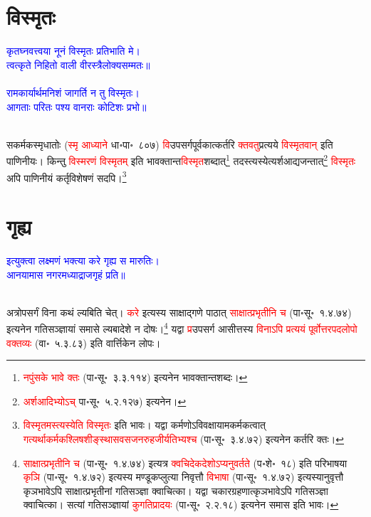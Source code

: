 \section[विस्मृतः]{विस्मृतः}
\centering\textcolor{blue}{कृतघ्नवत्त्वया नूनं विस्मृतः प्रतिभाति मे।\nopagebreak\\
त्वत्कृते निहितो वाली वीरस्त्रैलोक्यसम्मतः॥}\nopagebreak\\
\\
\centering\textcolor{blue}{रामकार्यार्थमनिशं जागर्ति न तु विस्मृतः।\nopagebreak\\
आगताः परितः पश्य वानराः कोटिशः प्रभो॥}\nopagebreak\\
\\
\begin{sloppypar}\justifying\noindent\hspace{10mm} सकर्मक\-स्मृ\-धातोः (\textcolor{red}{स्मृ आध्याने} धा॰पा॰~८०७) \textcolor{red}{वि}\-उपसर्ग\-पूर्वकात्कर्तरि \textcolor{red}{क्तवतु}\-प्रत्यये \textcolor{red}{विस्मृतवान्} इति पाणिनीयः। किन्तु \textcolor{red}{विस्मरणं विस्मृतम्} इति भाव\-क्तान्त\-\textcolor{red}{विस्मृत}\-शब्दात्\footnote{\textcolor{red}{नपुंसके भावे क्तः} (पा॰सू॰~३.३.११४) इत्यनेन भाव\-क्तान्त\-शब्दः।} तदस्त्यस्येत्यर्शआद्यजन्तात्\footnote{\textcolor{red}{अर्शआदिभ्योऽच्} पा॰सू॰~५.२.१२७) इत्यनेन।} \textcolor{red}{विस्मृतः} अपि पाणिनीयं कर्तृ\-विशेषणं सदपि।\footnote{\textcolor{red}{विस्मृतमस्त्यस्येति विस्मृतः} इति भावः। यद्वा कर्मणोऽविवक्षायामकर्मकत्वात् \textcolor{red}{गत्यर्थाकर्मक\-श्लिष\-शीङ्स्थास\-वस\-जन\-रुह\-जीर्यतिभ्यश्च} (पा॰सू॰~३.४.७२) इत्यनेन कर्तरि क्तः।}\end{sloppypar}
\section[गृह्य]{गृह्य}
\centering\textcolor{blue}{इत्युक्त्वा लक्ष्मणं भक्त्या करे गृह्य स मारुतिः।\nopagebreak\\
आनयामास नगरमध्याद्राजगृहं प्रति॥}\nopagebreak\\
\\
\begin{sloppypar}\justifying\noindent\hspace{10mm} अत्रोपसर्गं विना कथं ल्यबिति चेत्।
\textcolor{red}{करे} इत्यस्य साक्षाद्गणे पाठात् \textcolor{red}{साक्षात्प्रभृतीनि च} (पा॰सू॰~१.४.७४) इत्यनेन गतिसञ्ज्ञायां समासे ल्यबादेशे न दोषः।\footnote{\textcolor{red}{साक्षात्प्रभृतीनि च} (पा॰सू॰~१.४.७४) इत्यत्र \textcolor{red}{क्वचिदेक\-देशोऽप्यनुवर्तते} (प॰शे॰~१८) इति परिभाषया \textcolor{red}{कृञि} (पा॰सू॰~१.४.७२) इत्यस्य मण्डूक\-प्लुत्या निवृत्तौ \textcolor{red}{विभाषा} (पा॰सू॰~१.४.७२) इत्यस्यानुवृत्तौ कृञभावेऽपि साक्षात्प्रभृतीनां गति\-सञ्ज्ञा क्वाचित्का। यद्वा चकार\-ग्रहणात्कृञभावेऽपि गति\-सञ्ज्ञा क्वाचित्का। सत्यां गतिसञ्ज्ञायां \textcolor{red}{कुगतिप्रादयः} (पा॰सू॰~२.२.१८) इत्यनेन समास इति भावः।}
यद्वा \textcolor{red}{प्र}\-उपसर्ग आसीत्तस्य \textcolor{red}{विनाऽपि प्रत्ययं पूर्वोत्तर\-पद\-लोपो वक्तव्यः} (वा॰~५.३.८३) इति वार्त्तिकेन लोपः।\end{sloppypar}
